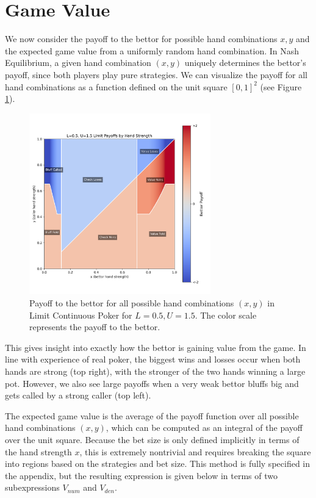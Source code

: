 \documentclass[a4paper,12pt]{article}
\theoremstyle{plain}
\theoremstyle{definition}
\begin{document}
\section{Game Value}
\label{sec:game_value}

We now consider the payoff to the bettor for possible hand combinations $x, y$ and the expected game value from a uniformly random hand combination. In Nash Equilibrium, a given hand combination $(x, y)$ uniquely determines the bettor's payoff, since both players play pure strategies. We can visualize the payoff for all hand combinations as a function defined on the unit square $[0, 1]^2$ (see Figure \ref{fig:gamevalue}).  

\begin{figure}[h!]
    \centering
    \includegraphics[width=0.7\textwidth]{LU_payoffs_0.5_1.5.png}
    \caption{Payoff to the bettor for all possible hand combinations $(x, y)$ in Limit Continuous Poker for $L=0.5, U=1.5$. The color scale represents the payoff to the bettor.}
    \label{fig:gamevalue}
\end{figure}

This gives insight into exactly how the bettor is gaining value from the game. In line with experience of real poker, the biggest wins and losses occur when both hands are strong (top right), with the stronger of the two hands winning a large pot. However, we also see large payoffs when a very weak bettor bluffs big and gets called by a strong caller (top left).  

The expected game value is the average of the payoff function over all possible hand combinations $(x, y)$, which can be computed as an integral of the payoff over the unit square. Because the bet size is only defined implicitly in terms of the hand strength $x$, this is extremely nontrivial and requires breaking the square into regions based on the strategies and bet size. This method is fully specified in the appendix, but the resulting expression is given below in terms of two subexpressions $V_{num}$ and $V_{den}$.
\end{document}
